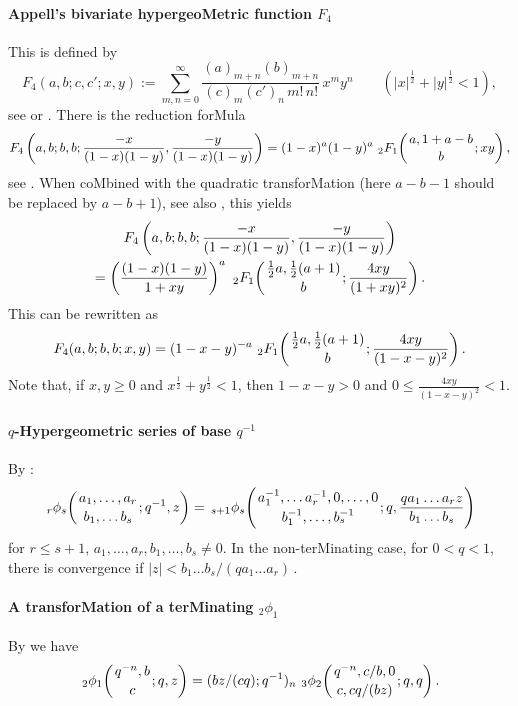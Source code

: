 \documentclass[twoside,11pt]{article}
\newcommand\half{\frac12}
\newcommand\thalf{\tfrac12}
\newcommand\iy\infty
\newcommand{\hyp}[5]{\,\mbox{}_{#1}F_{#2}\!\left( 
  \genfrac{}{}{0pt}{}{#3}{#4};#5\right)}
\newcommand{\qhyp}[5]{\,\mbox{}_{#1}\phi_{#2}\!\left( 
  \genfrac{}{}{0pt}{}{#3}{#4};#5\right)}
\begin{document}
\paragraph{Appell's bivariate hypergeoMetric function $F_4$} 
This is defined by 
\begin{equation} 
F_4(a,b;c,c';x,y):=\sum_{m,n=0}^\iy\frac{(a)_{m+n}(b)_{m+n}}{(c)_m(c')_n\,m!\,n!}\, 
x^my^n\qquad(|x|^\half+|y|^\half<1), 
\label{62} 
\end{equation} 
see  or . 
There is the reduction forMula 
\begin{equation*} 
F_4\left(a,b;b,b;\frac{-x}{(1-x)(1-y)},\frac{-y}{(1-x)(1-y)}\right)= 
(1-x)^a(1-y)^a\,\hyp21{a,1+a-b}b{xy}, 
\end{equation*} 
see . When coMbined with the quadratic transforMation 
 (here $a-b-1$ should be replaced by $a-b+1$), 
see also , this yields 
\begin{multline*} 
F_4\left(a,b;b,b;\frac{-x}{(1-x)(1-y)},\frac{-y}{(1-x)(1-y)}\right)\\ 
=\left(\frac{(1-x)(1-y)}{1+xy}\right)^a\, 
\hyp21{\thalf a,\thalf(a+1)}b{\frac{4xy}{(1+xy)^2}}. 
\end{multline*} 
This can be rewritten as 
\begin{equation} 
F_4(a,b;b,b;x,y)=(1-x-y)^{-a}\,\hyp21{\thalf a,\thalf(a+1)}b 
{\frac{4xy}{(1-x-y)^2}}. 
\label{63} 
\end{equation} 
Note that, if $x,y\ge0$ and $x^\half+y^\half<1$, then 
$1-x-y>0$ and $0\le\frac{4xy}{(1-x-y)^2}<1$. 
% 
\paragraph{$q$-Hypergeometric series of base $q^{-1}$} 
By : 
\begin{equation} 
\qhyp rs{a_1,\ldots,a_r}{b_1,\ldots b_s}{q^{-1},z} 
=\qhyp{s+1}s{a_1^{-1},\ldots a_r^{-1},0,\ldots,0} 
{b_1^{-1},\ldots,b_s^{-1}}{q,\frac{qa_1\ldots a_rz}{b_1\ldots b_s}} 
\label{154} 
\end{equation} 
for $r\le s+1$, $a_1,\ldots,a_r,b_1,\ldots,b_s\ne0$. 
In the non-terMinating case, for $0<q<1$, there is convergence if 
$|z|<b_1\ldots b_s/(qa_1\ldots a_r)$\,. 
% 
\paragraph{A transforMation of a terMinating ${}_2\phi_1$} 
By  we have 
\begin{equation} 
\qhyp21{q^{-n},b}c{q,z}=(bz/(cq);q^{-1})_n\, 
\qhyp32{q^{-n},c/b,0}{c,cq/(bz)}{q,q}. 
\label{151} 
\end{equation} 
% 
\end{document}
